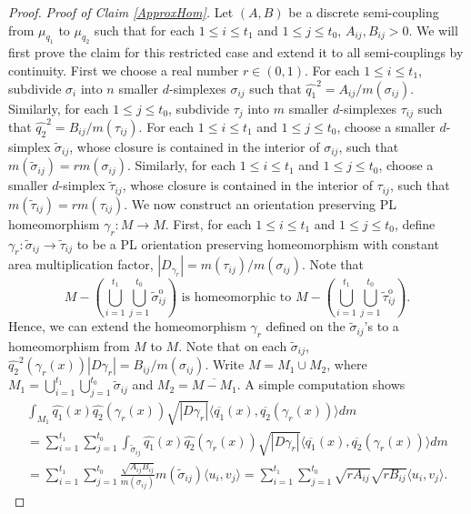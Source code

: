 \documentclass[final,hidelinks,onefignum,onetabnum]{siamart220329}
\begin{document}
\begin{proof}
\noindent\textit{Proof of Claim \ref{ApproxHom}. }Let $(A,B)$ be a discrete semi-coupling from $\mu_{q_1}$ to $\mu_{q_2}$ such that for each $1\leq i\leq t_1$ and $1\leq j\leq t_0$, $A_{ij},B_{ij}>0$. We will first prove the claim for this restricted case and extend it to all semi-couplings by continuity. First we choose a real number $r\in(0,1)$. For each $1\leq i\leq t_1$, subdivide $\sigma_i$ into $n$ smaller $d$-simplexes $\sigma_{ij}$ such that $\hat{q_1}^2=A_{ij}/m(\sigma_{ij})$. Similarly, for each $1\leq j\leq t_0$, subdivide $\tau_j$ into $m$ smaller $d$-simplexes $\tau_{ij}$ such that $\hat{q_2}^2=B_{ij}/m(\tau_{ij})$. For each $1\leq i\leq t_1$ and $1\leq j\leq t_0$, choose a smaller $d$-simplex $\tilde\sigma_{ij}$, whose closure is contained in the interior of $\sigma_{ij}$, such that $m(\tilde\sigma_{ij})=rm(\sigma_{ij})$. Similarly, for each $1\leq i\leq t_1$ and $1\leq j\leq t_0$, choose a smaller $d$-simplex $\tilde\tau_{ij}$, whose closure is contained in the interior of $\tau_{ij}$, such that $m(\tilde\tau_{ij})=rm(\tau_{ij})$. We now construct an orientation preserving PL homeomorphism $\gamma_r:M\to M$. First, for each $1\leq i\leq t_1$ and $1\leq j\leq t_0$, define $\gamma_r:\tilde\sigma_{ij}\to\tilde\tau_{ij}$ to be a PL orientation preserving homeomorphism with constant area multiplication factor, $|D_{\gamma_r}|=m(\tau_{ij})/m(\sigma_{ij})$. Note that \[M-\left(\bigcup\limits_{i=1}^{t_1}\bigcup\limits_{j=1}^{t_0}\tilde\sigma_{ij}^{\mathrm{o}}\right)\text{ is homeomorphic to }M-\left(\bigcup\limits_{i=1}^{t_1}\bigcup\limits_{j=1}^{t_0}\tilde\tau_{ij}^{\mathrm{o}}\right).\] Hence, we can extend the homeomorphism $\gamma_r$ defined on the $\tilde\sigma_{ij}$'s to a homeomorphism from $M$ to $M$.  
Note that on each $\tilde{\sigma}_{ij}$, $\hat{q_2}^2(\gamma_r(x))|D\gamma_r|=B_{ij}/m(\sigma_{ij})$. Write $M=M_1\cup M_2$, where $M_1=\bigcup\limits_{i=1}^{t_1}\bigcup\limits_{j=1}^{t_0}\tilde\sigma_{ij}$ and $M_2=\overline{M-M_1}$. A simple computation shows
\begin{multline*}
\int_{M_1}\hat{q_1}(x)\hat{q_2}(\gamma_r(x))\sqrt{|D\gamma_r|}\langle\overline{q_1}(x),\overline{q_2}(\gamma_r(x))\rangle dm\\
=\sum\limits_{i=1}^{t_1}\sum_{j=1}^{t_0}\int_{\tilde\sigma_{ij}}\hat{q_1}(x)\hat{q_2}(\gamma_r(x))\sqrt{|D\gamma_r|}\langle\overline{q_1}(x),\overline{q_2}(\gamma_r(x))\rangle dm\\
=\sum\limits_{i=1}^{t_1}\sum_{j=1}^{t_0}\frac{\sqrt{A_{ij}B_{ij}}}{m(\sigma_{ij})}m(\tilde\sigma_{ij})\langle u_i,v_j\rangle=\sum\limits_{i=1}^{t_1}\sum_{j=1}^{t_0}\sqrt{rA_{ij}}\sqrt{rB_{ij}}\langle u_i,v_j\rangle.    

\end{multline*}
\end{proof}
\end{document}
